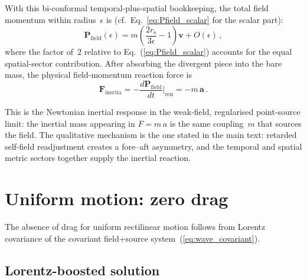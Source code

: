 \documentclass[11pt]{article}
\newcommand{\rs}{r_{\mathrm{s}}}
\begin{document}
With this bi-conformal temporal-plus-spatial bookkeeping, the
total field momentum within radius~$\epsilon$ is
(cf.\ Eq.~\ref{eq:Pfield_scalar} for the scalar part):
\begin{equation}\label{eq:P_total}
  \mathbf{P}_{\mathrm{field}}(\epsilon)
  = m\!\left(\frac{2\rs}{3\epsilon} - 1\right)\mathbf{v}
  + O(\epsilon)\,,
\end{equation}
where the factor of~$2$ relative to
Eq.~(\ref{eq:Pfield_scalar}) accounts for the equal
spatial-sector contribution.  After absorbing the
divergent piece into the bare mass, the physical
field-momentum reaction force is
\begin{equation}\label{eq:F_total}
  \mathbf{F}_{\mathrm{inertia}}
  = -\frac{d\mathbf{P}_{\mathrm{field}}}{dt}\bigg|_{\mathrm{ren}}
  = -m\,\mathbf{a}\,.
\end{equation}

This is the Newtonian inertial response in the weak-field,
regularised point-source limit: the inertial mass appearing
in $F = m\,a$ is the same coupling~$m$ that sources the
field.  The qualitative mechanism is the one stated in the
main text: retarded self-field readjustment creates a
fore--aft asymmetry, and the temporal and spatial metric
sectors together supply the inertial reaction.

\section{Uniform motion: zero drag}\label{sec:zero_drag}

The absence of drag for uniform rectilinear motion
follows from Lorentz covariance of the covariant
field+source system~(\ref{eq:wave_covariant}).

\subsection{Lorentz-boosted solution}
\end{document}
